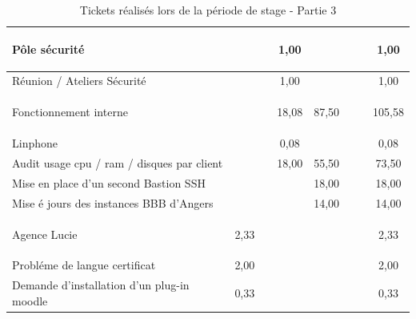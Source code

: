 \documentclass[12pt, a4paper, twoside]{article}
\begin{document}
\begin{table}[!ht]
\begin{adjustbox}{max width=\textwidth}
\begin{tabular}{|p{6cm}|c|c|c|c|c|c|c|}
    \begin{code}Pôle sécurité\end{code} &  &  & 1,00 &  &  &  & 1,00 \\ \hline
    Réunion / Ateliers Sécurité &  &  & 1,00 &  &  &  & 1,00 \\ \hline
    \begin{code}Fonctionnement interne\end{code} &  &  & 18,08 & 87,50 &  &  & 105,58 \\ \hline
    Linphone &  &  & 0,08 &  &  &  & 0,08 \\ \hline
    Audit usage cpu / ram / disques par client &  &  & 18,00 & 55,50 &  &  & 73,50 \\ \hline
    Mise en place d'un second Bastion SSH &  &  &  & 18,00 &  &  & 18,00 \\ \hline
    Mise é jours des instances BBB d'Angers &  &  &  & 14,00 &  &  & 14,00 \\ \hline
    \begin{code}Agence Lucie\end{code} & 2,33 &  &  &  &  &  & 2,33 \\ \hline
    Probléme de langue certificat & 2,00 &  &  &  &  &  & 2,00 \\ \hline
    Demande d'installation d'un plug-in moodle & 0,33 &  &  &  &  &  & 0,33 \\ \hline
\end{tabular}
\end{adjustbox}
\caption{Tickets réalisés lors de la période de stage - Partie 3}
\end{table}
\end{document}
